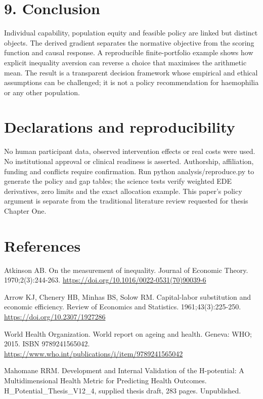 \documentclass[11pt,a4paper]{article}
\begin{document}
\section*{9. Conclusion}
Individual capability, population equity and feasible policy are linked but distinct objects. The derived gradient separates the normative objective from the scoring function and causal response. A reproducible finite-portfolio example shows how explicit inequality aversion can reverse a choice that maximises the arithmetic mean. The result is a transparent decision framework whose empirical and ethical assumptions can be challenged; it is not a policy recommendation for haemophilia or any other population.

\section*{Declarations and reproducibility}
No human participant data, observed intervention effects or real costs were used. No institutional approval or clinical readiness is asserted. Authorship, affiliation, funding and conflicts require confirmation. Run python analysis/reproduce.py to generate the policy and gap tables; the science tests verify weighted EDE derivatives, zero limits and the exact allocation example. This paper's policy argument is separate from the traditional literature review requested for thesis Chapter One.

\section*{References}
\begin{list}{}{\setlength{\leftmargin}{2em}\setlength{\itemindent}{-2em}\setlength{\itemsep}{0.3\baselineskip}}\small
\item [1] Atkinson AB. On the measurement of inequality. Journal of Economic Theory. 1970;2(3):244-263. \url{https://doi.org/10.1016/0022-0531(70)90039-6}
\item [2] Arrow KJ, Chenery HB, Minhas BS, Solow RM. Capital-labor substitution and economic efficiency. Review of Economics and Statistics. 1961;43(3):225-250. \url{https://doi.org/10.2307/1927286}
\item [3] World Health Organization. World report on ageing and health. Geneva: WHO; 2015. ISBN 9789241565042. \url{https://www.who.int/publications/i/item/9789241565042}
\item [4] Mahomane RRM. Development and Internal Validation of the H-potential: A Multidimensional Health Metric for Predicting Health Outcomes. H\_Potential\_Thesis\_V12\_4, supplied thesis draft, 283 pages. Unpublished.
\end{list}
\end{document}
